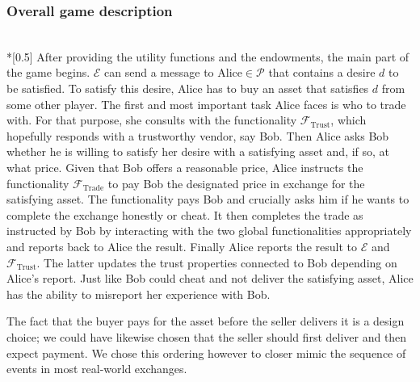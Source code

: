 \subsubsection{Overall game description} \ \\*[0.5\baselineskip]
  After providing the utility functions and the endowments, the main part of the game
  begins. $\mathcal{E}$ can send a message to $\mathrm{Alice} \in \mathcal{P}$ that
  contains a desire $d$ to be satisfied. To satisfy this desire, Alice has to buy an asset
  that satisfies $d$ from some other player. The first and most important task Alice faces
  is who to trade with. For that purpose, she consults with the functionality
  $\mathcal{F}_{\mathrm{Trust}}$, which hopefully responds with a trustworthy vendor, say
  Bob. Then Alice asks Bob whether he is willing to satisfy her desire with a satisfying
  asset and, if so, at what price. Given that Bob offers a reasonable price, Alice
  instructs the functionality $\mathcal{F}_{\mathrm{Trade}}$ to pay Bob the designated
  price in exchange for the satisfying asset. The functionality pays Bob and crucially
  asks him if he wants to complete the exchange honestly or cheat. It then completes the
  trade as instructed by Bob by interacting with the two global functionalities
  appropriately and reports back to Alice the result. Finally Alice reports the result to
  $\mathcal{E}$ and $\mathcal{F}_{\mathrm{Trust}}$. The latter updates the trust
  properties connected to Bob depending on Alice's report. Just like Bob could cheat and
  not deliver the satisfying asset, Alice has the ability to misreport her experience with
  Bob.

  The fact that the buyer pays for the asset before the seller delivers it is a design
  choice; we could have likewise chosen that the seller should first deliver and then
  expect payment. We chose this ordering however to closer mimic the sequence of events in
  most real-world exchanges.
